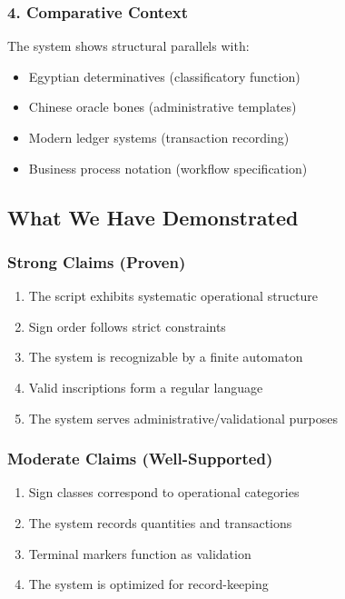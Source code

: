 \subsubsection{4. Comparative Context}
The system shows structural parallels with:
\begin{itemize}
    \item Egyptian determinatives (classificatory function)
    \item Chinese oracle bones (administrative templates)
    \item Modern ledger systems (transaction recording)
    \item Business process notation (workflow specification)
\end{itemize}

\subsection{What We Have Demonstrated}

\subsubsection{Strong Claims (Proven)}
\begin{enumerate}
    \item The script exhibits systematic operational structure
    \item Sign order follows strict constraints
    \item The system is recognizable by a finite automaton
    \item Valid inscriptions form a regular language
    \item The system serves administrative/validational purposes
\end{enumerate}

\subsubsection{Moderate Claims (Well-Supported)}
\begin{enumerate}
    \item Sign classes correspond to operational categories
    \item The system records quantities and transactions
    \item Terminal markers function as validation
    \item The system is optimized for record-keeping
\end{enumerate}

